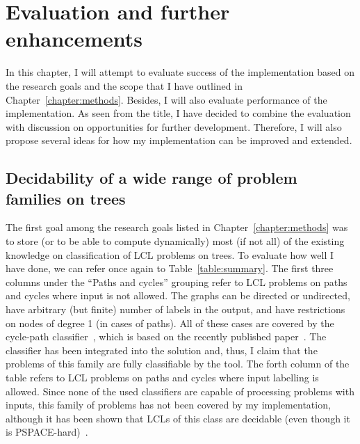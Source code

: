 \chapter{Evaluation and further enhancements}
\label{chapter:evaluation}

In this chapter, I will attempt to evaluate success of the implementation
based on the research goals and the scope that I have outlined in Chapter~\ref{chapter:methods}.
Besides, I will also evaluate performance of the implementation.
As seen from the title,
I have decided to combine the evaluation with discussion on opportunities for further
development. Therefore, I will also propose several ideas for how my implementation
can be improved and extended.

\section{Decidability of a wide range of problem families on trees}

The first goal among the research goals listed in Chapter~\ref{chapter:methods}
was to store (or to be able to compute dynamically) most
(if not all) of the existing knowledge on classification of LCL problems on trees.
To evaluate how well I have done, we can refer once again to Table~\ref{table:summary}.
The first three columns under the ``Paths and cycles'' grouping refer to LCL problems on
paths and cycles where input is not allowed. The graphs can be directed or undirected,
have arbitrary (but finite) number of labels in the output, and have restrictions
on nodes of degree 1 (in cases of paths). All of these cases are covered by
the cycle-path classifier~\cite{Tereshchenko2020}, which is based on the recently
published paper~\cite{Chang2020}. The classifier has been integrated into the
solution and, thus, I claim that the problems of this family are fully classifiable by the tool.
The forth column of the table refers to LCL problems on paths and cycles
where input labelling is allowed. Since none of the used classifiers
are capable of processing problems with inputs, this family of problems
has not been covered by my implementation, although it has been shown that
LCLs of this class are decidable (even though it is PSPACE-hard)~\cite{Balliu2018}.

